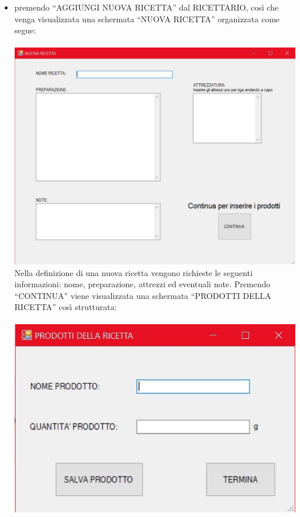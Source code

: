 \documentclass[a4paper, titlepage]{article}
\begin{document}
\begin{itemize}
    \item premendo “AGGIUNGI NUOVA RICETTA” dal RICETTARIO, così che venga visualizzata una schermata “NUOVA RICETTA” organizzata come segue:\\\\
    \includegraphics[scale=0.30]{Immagini/form/Form AggiungiRic.jpg}
    \\Nella definizione di una nuova ricetta vengono richieste le seguenti informazioni: nome, preparazione, attrezzi ed eventuali note. Premendo “CONTINUA” viene visualizzata una schermata “PRODOTTI DELLA RICETTA” così strutturata:\\\\
    \includegraphics[scale=0.30]{Immagini/form/Form AggiungiProdottiRicetta.jpg}

\end{itemize}
\end{document}
